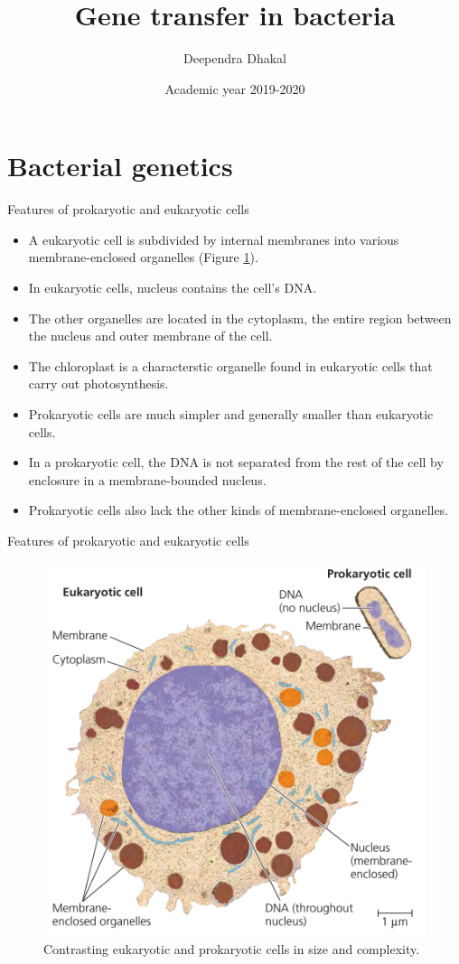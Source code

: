 \documentclass[ignorenonframetext,aspectratio=169]{beamer}
\title{Gene transfer in bacteria}
\author{Deependra Dhakal}
\institute{GAASC, Baitadi \and Tribhuwan University}
\date{Academic year 2019-2020}
\providecommand{\tightlist}{%
  \setlength{\itemsep}{0pt}\setlength{\parskip}{0pt}}
\begin{document}
\frame{\titlepage}

\begin{frame}
\tableofcontents[hideallsubsections]
\end{frame}
\hypertarget{bacterial-genetics}{%
\section{Bacterial genetics}\label{bacterial-genetics}}

\begin{frame}{Features of prokaryotic and eukaryotic cells}
\protect\hypertarget{features-of-prokaryotic-and-eukaryotic-cells}{}

\begin{itemize}
\tightlist
\item
  A eukaryotic cell is subdivided by internal membranes into various
  membrane-enclosed organelles (Figure \ref{fig:eu-prokaryotic-cell}).
\item
  In eukaryotic cells, nucleus contains the cell's DNA.
\item
  The other organelles are located in the cytoplasm, the entire region
  between the nucleus and outer membrane of the cell.
\item
  The chloroplast is a characterstic organelle found in eukaryotic cells
  that carry out photosynthesis.
\item
  Prokaryotic cells are much simpler and generally smaller than
  eukaryotic cells.
\item
  In a prokaryotic cell, the DNA is not separated from the rest of the
  cell by enclosure in a membrane-bounded nucleus.
\item
  Prokaryotic cells also lack the other kinds of membrane-enclosed
  organelles.
\end{itemize}

\end{frame}

\begin{frame}{Features of prokaryotic and eukaryotic cells}
\protect\hypertarget{features-of-prokaryotic-and-eukaryotic-cells-1}{}

\begin{figure}
\includegraphics[width=0.35\linewidth]{./../images/eukaryotic_prokaryotic} \caption{Contrasting eukaryotic and prokaryotic cells in size and complexity.}\label{fig:eu-prokaryotic-cell}
\end{figure}

\end{frame}
\end{document}
